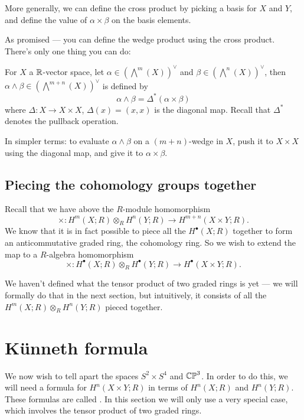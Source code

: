 More generally, we can define the cross product by picking a basis for $X$ and $Y$, and define the
value of $\alpha \times \beta$ on the basis elements.

As promised --- you can define the wedge product using the cross product.
There's only one thing you can do:
\begin{definition}
	For $X$ a $\mathbb R$-vector space,
	let $\alpha \in (\bigwedge^m(X))^\vee$ and $\beta \in (\bigwedge^n(X))^\vee$,
	then $\alpha \wedge \beta \in (\bigwedge^{m + n}(X))^\vee$ is defined by
	\[
		\alpha \wedge \beta = \Delta^*(\alpha \times \beta)
	\]
	where $\Delta \colon X \to X \times X$, $\Delta(x) = (x, x)$ is the diagonal map.
	Recall that $\Delta^*$ denotes the pullback operation.
\end{definition}
In simpler terms:
to evaluate $\alpha \wedge \beta$ on a $(m + n)$-wedge in $X$,
push it to $X \times X$ using the diagonal map, and give it to $\alpha \times \beta$.

\subsection{Piecing the cohomology groups together}

Recall that we have above the $R$-module homomorphism
\[ \times \colon H^m(X; R) \otimes_R H^n(Y; R) \to H^{m + n}(X \times Y; R). \]
We know that it is in fact possible to piece all the $H^\bullet(X; R)$ together to form
an anticommutative graded ring, the cohomology ring. So we wish to extend the map to a
$R$-algebra homomorphism
\[ \times \colon H^\bullet(X; R) \otimes_R H^\bullet(Y; R) \to H^\bullet(X \times Y; R). \]

We haven't defined what the tensor product of two graded rings is yet --- we will formally do that
in the next section, but intuitively, it consists of all the $H^m(X; R) \otimes_R H^n(Y; R)$
pieced together.

\section{K\"unneth formula}
We now wish to tell apart the spaces $S^2 \times S^4$ and $\mathbb{CP}^3$.
In order to do this, we will need a formula
for $H^n(X \times Y; R)$ in terms of $H^n(X;R)$ and $H^n(Y;R)$.
These formulas are called .
In this section we will only use a very special case,
which involves the tensor product of two graded rings.

